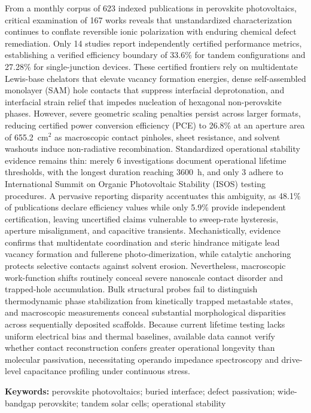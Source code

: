 \documentclass[
  11pt,
]{article}
\begin{document}
From a monthly corpus of 623 indexed publications in perovskite
photovoltaics, critical examination of 167 works reveals that
unstandardized characterization continues to conflate reversible ionic
polarization with enduring chemical defect remediation. Only 14 studies
report independently certified performance metrics, establishing a
verified efficiency boundary of 33.6\% for tandem configurations and
27.28\% for single-junction devices. These certified frontiers rely on
multidentate Lewis-base chelators that elevate vacancy formation
energies, dense self-assembled monolayer (SAM) hole contacts that
suppress interfacial deprotonation, and interfacial strain relief that
impedes nucleation of hexagonal non-perovskite phases. However, severe
geometric scaling penalties persist across larger formats, reducing
certified power conversion efficiency (PCE) to 26.8\% at an aperture
area of \qty{655.2}{\centi\meter}\(^2\) as macroscopic contact pinholes,
sheet resistance, and solvent washouts induce non-radiative
recombination. Standardized operational stability evidence remains thin:
merely 6 investigations document operational lifetime thresholds, with
the longest duration reaching \qty{3600}{\hour}, and only 3 adhere to
International Summit on Organic Photovoltaic Stability (ISOS) testing
procedures. A pervasive reporting disparity accentuates this ambiguity,
as 48.1\% of publications declare efficiency values while only 5.9\%
provide independent certification, leaving uncertified claims vulnerable
to sweep-rate hysteresis, aperture misalignment, and capacitive
transients. Mechanistically, evidence confirms that multidentate
coordination and steric hindrance mitigate lead vacancy formation and
fullerene photo-dimerization, while catalytic anchoring protects
selective contacts against solvent erosion. Nevertheless, macroscopic
work-function shifts routinely conceal severe nanoscale contact disorder
and trapped-hole accumulation. Bulk structural probes fail to
distinguish thermodynamic phase stabilization from kinetically trapped
metastable states, and macroscopic measurements conceal substantial
morphological disparities across sequentially deposited scaffolds.
Because current lifetime testing lacks uniform electrical bias and
thermal baselines, available data cannot verify whether contact
reconstruction confers greater operational longevity than molecular
passivation, necessitating operando impedance spectroscopy and
drive-level capacitance profiling under continuous stress.

\textbf{Keywords:} perovskite photovoltaics; buried interface; defect
passivation; wide-bandgap perovskite; tandem solar cells; operational
stability
\end{document}

